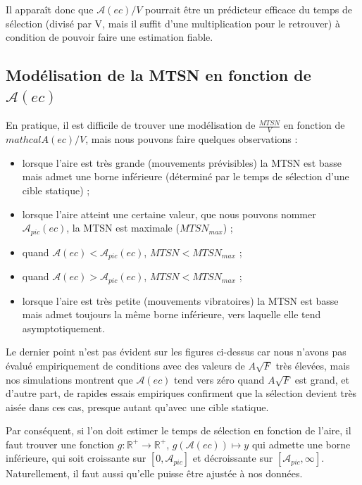 	Il apparaît donc que $\mathcal{A}(ec)/V$ pourrait être un prédicteur efficace du temps de sélection (divisé par V, mais il suffit d'une multiplication pour le retrouver) à condition de pouvoir faire une estimation fiable.
	
	
	\subsection{Modélisation de la MTSN en fonction de \texorpdfstring{$\mathcal{A}(ec)$}{A(ec)}}
	En pratique, il est difficile de trouver une modélisation de $\frac{MTSN}{V}$ en fonction de $mathcal{A}(ec)/V$, mais nous pouvons faire quelques observations :
	
	\begin{itemize}
		\item lorsque l'aire est très grande (mouvements prévisibles) la MTSN est basse mais admet une borne inférieure (déterminé par le temps de sélection d'une cible statique) ;
		\item lorsque l'aire atteint une certaine valeur, que nous pouvons nommer $\mathcal{A}_{pic}(ec)$, la MTSN est maximale ($MTSN_{max}$) ;
		\item quand $\mathcal{A}(ec) < \mathcal{A}_{pic}(ec)$, $MTSN < MTSN_{max}$ ;
		\item quand $\mathcal{A}(ec) > \mathcal{A}_{pic}(ec)$, $MTSN < MTSN_{max}$ ;
		\item lorsque l'aire est très petite (mouvements vibratoires) la MTSN est basse mais admet toujours la même borne inférieure, vers laquelle elle tend asymptotiquement.
	\end{itemize}
	
	Le dernier point n'est pas évident sur les figures ci-dessus car nous n'avons pas évalué empiriquement de conditions avec des valeurs de $A\sqrt{F}$ très élevées, mais nos simulations montrent que $\mathcal{A}(ec)$ tend vers zéro quand $A\sqrt{F}$ est grand, et d'autre part, de rapides essais empiriques confirment que la sélection devient très aisée dans ces cas, presque autant qu'avec une cible statique.
	
	Par conséquent, si l'on doit estimer le temps de sélection en fonction de l'aire, il faut trouver une fonction $g : \mathbb{R}^{+} \to \mathbb{R}^{+}$, $g\left(\mathcal{A}(ec)\right) \mapsto y$ qui admette une borne inférieure, qui soit croissante sur $[0, \mathcal{A}_{pic}]$ et décroissante sur $[\mathcal{A}_{pic}, \infty]$. Naturellement, il faut aussi qu'elle puisse être ajustée à nos données.
	

